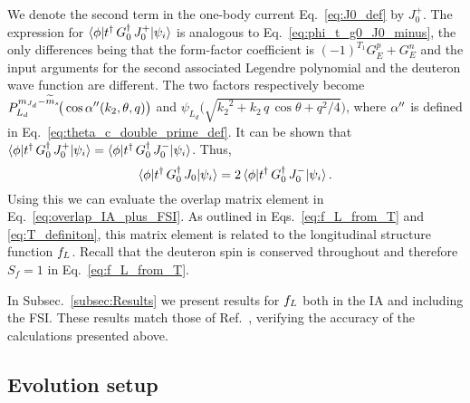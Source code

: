 	We denote the second term in the one-body current Eq.~\eqref{eq:J0_def} by
	$J_0^+$.  The expression for $\langle \phi|t^\dag \, G_0^\dag \,
	J_0^+|\psi_i\rangle$ is analogous to Eq.~\eqref{eq:phi_t_g0_J0_minus}, the only
	differences being that the form-factor coefficient is $(-1)^{T_1} G_E^p +
	G_E^n$ and the input arguments for the second associated Legendre polynomial
	and the deuteron wave function are different.  The two factors respectively
	become $\displaystyle P_{L_d}^{m_{J_d} - \widetilde{m}_s}\!
	\big(\cos\alpha^{\prime \prime}(k_2, \theta, q)\big)$
	and $\psi_{L_d}\big(\sqrt{{k_2}^2 + k_2 \,q \, \cos\theta + q^2/4}\big)$,
	where	$\alpha^{\prime \prime}$ is defined in
	Eq.~\eqref{eq:theta_c_double_prime_def}.
	It can be shown that
	$\langle \phi|t^\dag \, G_0^\dag \, J_0^+|\psi_i\rangle
	= \langle \phi|t^\dag \, G_0^\dag \, J_0^-|\psi_i\rangle$.  Thus,
	\begin{equation}
	 \langle \phi|t^\dag \, G_0^\dag \, J_0|\psi_i\rangle
	 = 2 \, \langle \phi|t^\dag \, G_0^\dag \, J_0^-|\psi_i\rangle \,.
	\label{eq:J0_minus_twice_relation}
	\end{equation}
	Using this we can evaluate the overlap matrix element in
	Eq.~\eqref{eq:overlap_IA_plus_FSI}.  As outlined in Eqs.~\eqref{eq:f_L_from_T}
	and \eqref{eq:T_definiton}, this matrix element is related to the
	longitudinal structure function $f_L$.  Recall that the deuteron spin is
	conserved throughout and therefore $S_f = 1$ in Eq.~\eqref{eq:f_L_from_T}.

	In Subsec.~\ref{subsec:Results} we present results for $f_L$ both in
	the IA and including the FSI.  These results match those of
	Ref.~\cite{Yang:2013rza,Arenhoevel:1992xu}, verifying the accuracy of the
	calculations presented above.

	\subsection{Evolution setup}
	\label{subsec:evolution_setup}

